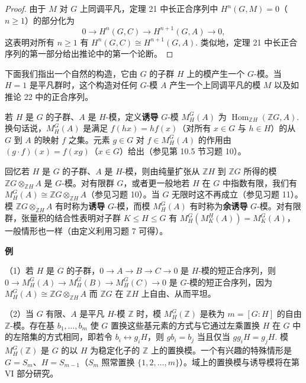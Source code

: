 \begin{proof}
由于 \(M\) 对 \(G\) 上同调平凡，定理 21 中长正合序列中 \(H^n(G, M) = 0\)（\(n \geq 1\)）的部分化为
\[
0 \to H^n(G, C) \to H^{n+1}(G, A) \to 0,
\]
这表明对所有 \(n \geq 1\) 有 \(H^n(G, C) \cong H^{n+1}(G, A)\). 类似地，定理 21 中长正合序列的第一部分给出推论中的第一个论断。
\end{proof}

下面我们指出一个自然的构造，它由 \(G\) 的子群 \(H\) 上的模产生一个 \(G\)-模。当 \(H = 1\) 是平凡群时，这个构造对任何 \(G\)-模 \(A\) 产生一个上同调平凡的模 \(M\) 以及如推论 22 中的正合序列。

\begin{definition}
若 \(H\) 是 \(G\) 的子群、\(A\) 是 \(H\)-模，定义\textbf{诱导} \(G\)-模 \(M_H^G(A)\) 为 \(\operatorname{Hom}_{\mathbb{Z}H}(\mathbb{Z}G, A)\). 换句话说，\(M_H^G(A)\) 是满足 \(f(hx) = hf(x)\)（对所有 \(x \in G\) 与 \(h \in H\)）的从 \(G\) 到 \(A\) 的映射 \(f\) 之集。元素 \(g \in G\) 对 \(f \in M_H^G(A)\) 的作用由 \((g \cdot f)(x) = f(xg)\)（\(x \in G\)）给出（参见第 10.5 节习题 10）。
\end{definition}

回忆若 \(H\) 是 \(G\) 的子群、\(A\) 是 \(H\)-模，则由纯量扩张从 \(\mathbb{Z}H\) 到 \(\mathbb{Z}G\) 所得的模 \(\mathbb{Z}G \otimes_{\mathbb{Z}H}A\) 是 \(G\)-模。对有限群 \(G\)，或者更一般地若 \(H\) 在 \(G\) 中指数有限，我们有 \(M_H^G(A) \cong \mathbb{Z}G \otimes_{\mathbb{Z}H}A\)（参见习题 10）。当 \(G\) 无限时这不再成立（参见习题 11）。模 \(\mathbb{Z}G \otimes_{\mathbb{Z}H}A\) 有时称为\textbf{诱导} \(G\)-模，而模 \(M_H^G(A)\) 有时称为\textbf{余诱导} \(G\)-模。对有限群，张量积的结合性表明对子群 \(K \leq H \leq G\) 有 \(M_H^G(M_K^H(A)) = M_K^G(A)\)，一般情形也一样（由定义利用习题 7 可得）。

\noindent\textbf{例}

（1）若 \(H\) 是 \(G\) 的子群，\(0 \to A \to B \to C \to 0\) 是 \(H\)-模的短正合序列，则 \(0 \to M_H^G(A) \to M_H^G(B) \to M_H^G(C) \to 0\) 是 \(G\)-模的短正合序列，因为 \(M_H^G(A) \cong \mathbb{Z}G \otimes_{\mathbb{Z}H}A\) 而 \(\mathbb{Z}G\) 在 \(\mathbb{Z}H\) 上自由、从而平坦。

（2）当 \(G\) 有限、\(A\) 是平凡 \(H\)-模 \(\mathbb{Z}\) 时，模 \(M_H^G(\mathbb{Z})\) 是秩为 \(m = [G:H]\) 的自由 \(\mathbb{Z}\)-模。存在基 \(b_1, \ldots, b_m\) 使 \(G\) 置换这些基元素的方式与它通过左乘置换 \(H\) 在 \(G\) 中的左陪集的方式相同，即若令 \(b_i \leftrightarrow g_iH\)，则 \(gb_i = b_j\) 当且仅当 \(gg_iH = g_jH\). 模 \(M_H^G(\mathbb{Z})\) 是 \(G\) 的以 \(H\) 为稳定化子的 \(\mathbb{Z}\) 上的置换模。一个有兴趣的特殊情形是 \(G = S_m\)、\(H = S_{m-1}\)（\(S_m\) 照常置换 \(\{1, 2, \ldots, m\}\)）。域上的置换模与诱导模将在第 VI 部分研究。

